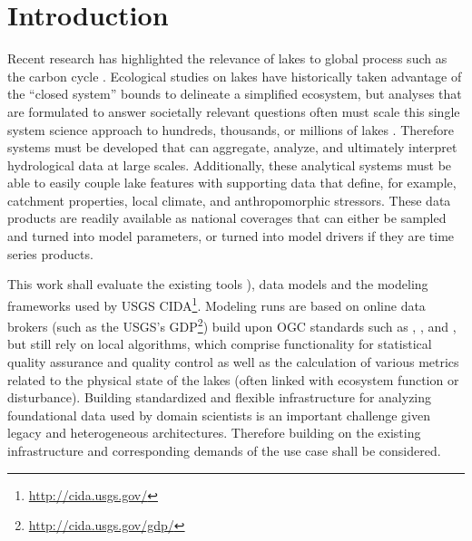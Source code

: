

\chapter{Introduction}
  Recent research has highlighted the relevance of lakes to global process such as the carbon cycle \citep{cole2007plumbing}.
  Ecological studies on lakes have historically taken advantage of the ``closed system'' bounds to delineate a simplified ecosystem, but analyses that are formulated to answer societally relevant questions often must scale this single system science approach to hundreds, thousands, or millions of lakes \citep{downing2006global}.
  Therefore systems must be developed that can aggregate, analyze, and ultimately interpret hydrological data at large scales. Additionally, these analytical systems must be able to easily couple lake features with supporting data that define, for example, catchment properties, local climate, and anthropomorphic stressors.
  These data products are readily available as national coverages that can either be sampled and turned into model parameters, or turned into model drivers if they are time series products.

  This work shall evaluate the existing tools \citep[e.g. \la\footnote{\url{https://github.com/GLEON/Lake-Analyzer}}, see][]{read2011derivation}), data models and the modeling frameworks used by USGS CIDA\footnote{\url{http://cida.usgs.gov/}}.
  Modeling runs are based on online data brokers (such as the USGS’s \ac{GDP}\footnote{\url{http://cida.usgs.gov/gdp/}}) build upon \ac{OGC} standards such as , ,  and , but still rely on local algorithms, which comprise functionality for statistical quality assurance and quality control as well as the calculation of various metrics related to the physical state of the lakes (often linked with ecosystem function or disturbance). Building standardized and flexible infrastructure for analyzing foundational data used by domain scientists is an important challenge given legacy and heterogeneous architectures.
  Therefore building on the existing infrastructure and corresponding demands of the use case shall be considered.

